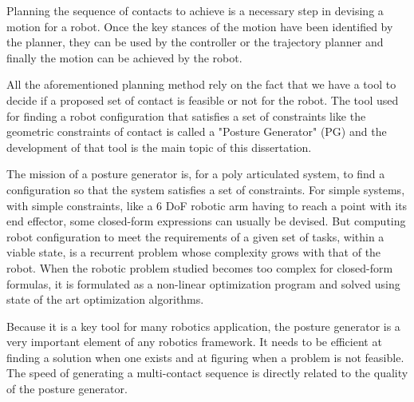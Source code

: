 Planning the sequence of contacts to achieve is a necessary step in devising a motion for a robot.
Once the key stances of the motion have been identified by the planner, they can be used by the controller or the trajectory planner and finally the motion can be achieved by the robot.

All the aforementioned planning method rely on the fact that we have a tool to decide if a proposed set of contact is feasible or not for the robot.
The tool used for finding a robot configuration that satisfies a set of constraints like the geometric constraints of contact is called a "Posture Generator" (PG) and the development of that tool is the main topic of this dissertation.

The mission of a posture generator is, for a poly articulated system, to find a configuration so that the system satisfies a set of constraints.
For simple systems, with simple constraints, like a 6 DoF robotic arm having to reach a point with its end effector, some closed-form expressions can usually be devised.
But computing robot configuration to meet the requirements of a given set of tasks, within a viable state, is a recurrent problem whose complexity grows with that of the robot.
When the robotic problem studied becomes too complex for closed-form formulas, it is formulated as a non-linear optimization program and solved using state of the art optimization algorithms.

Because it is a key tool for many robotics application, the posture generator is a very important element of any robotics framework.
It needs to be efficient at finding a solution when one exists and at figuring when a problem is not feasible.
The speed of generating a multi-contact sequence is directly related to the quality of the posture generator.


